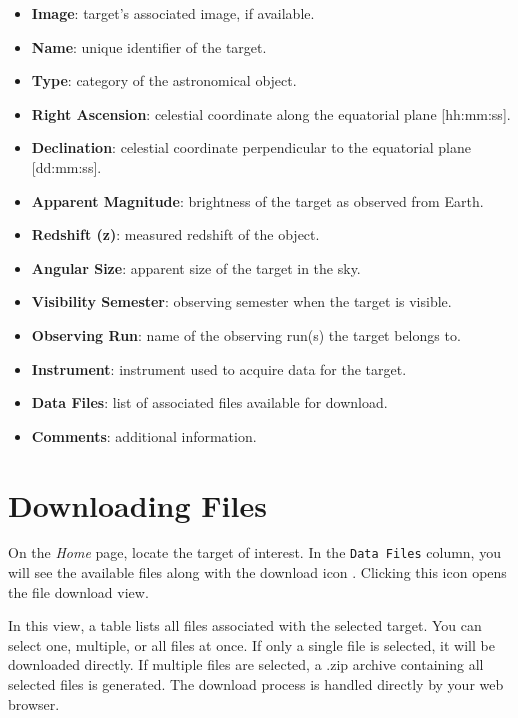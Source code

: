 \begin{itemize}
	\item \textbf{Image}: target's associated image, if available.
	\item \textbf{Name}: unique identifier of the target.
	\item \textbf{Type}: category of the astronomical object.
	\item \textbf{Right Ascension}: celestial coordinate along the equatorial plane [hh:mm:ss].
	\item \textbf{Declination}: celestial coordinate perpendicular to the equatorial plane [dd:mm:ss].
	\item \textbf{Apparent Magnitude}: brightness of the target as observed from Earth.
	\item \textbf{Redshift (z)}: measured redshift of the object.
	\item \textbf{Angular Size}: apparent size of the target in the sky.
	\item \textbf{Visibility Semester}: observing semester when the target is visible.
	\item \textbf{Observing Run}: name of the observing run(s) the target belongs to.
	\item \textbf{Instrument}: instrument used to acquire data for the target.
	\item \textbf{Data Files}: list of associated files available for download.
	\item \textbf{Comments}: additional information.
\end{itemize}


\newpage

\chapter{Downloading Files} \label{chap:user-download-files} 
   	
On the \textsl{Home} page, locate the target of interest. In the \texttt{Data Files} column, you will see the available files along with the download icon {\scriptsize \grayblue{\faDownload{}}}. Clicking this icon opens the file download view.


In this view, a table lists all files associated with the selected target. You can select one, multiple, or all files at once. If only a single file is selected, it will be downloaded directly. If multiple files are selected, a .zip archive containing all selected files is generated. The download process is handled directly by your web browser.


